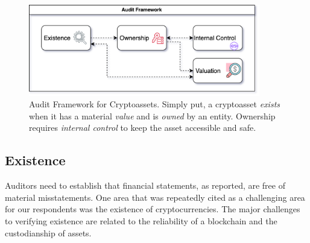 \begin{figure}[t]\label{fig:audit_framework}
    \centering
    \includegraphics[width=0.9\textwidth]{figures/audit_framework.png}
    \caption[Audit Framework for Cryptoassets]{Audit Framework for Cryptoassets. Simply put, a cryptoasset \textit{exists} when it has a material \textit{value} and is \textit{owned} by an entity. Ownership requires \textit{internal control} to keep the asset accessible and safe.}
\end{figure}	

\subsection{Existence} \label{sec:auditing:framework:existence}
Auditors need to establish that financial statements, as reported, are free of material misstatements. One area that was repeatedly cited as a challenging area for our respondents was the existence of cryptocurrencies. The major challenges to verifying existence are related to the reliability of a blockchain and the custodianship of assets.

